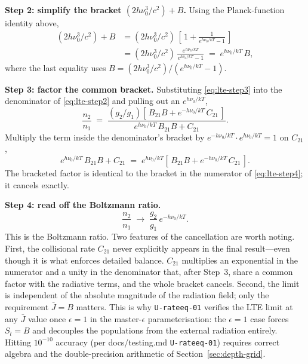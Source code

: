 \documentclass[11pt]{article}
\newcommand{\Jbar}{\bar{J}}
\begin{document}
\textbf{Step 2: simplify the bracket $(2 h\nu_0^3/c^2) + B$.}
Using the Planck-function identity above,
\begin{align}
(2 h\nu_0^3/c^2) + B
&= (2 h\nu_0^3/c^2)\,\!\left[\,1 + \frac{1}{e^{h\nu_0/kT} - 1}\,\right] \nonumber\\
&= (2 h\nu_0^3/c^2)\,\frac{e^{h\nu_0/kT}}{e^{h\nu_0/kT} - 1}
\;=\; e^{h\nu_0/kT}\, B ,
\label{eq:lte-step3}
\end{align}
where the last equality uses $B = (2 h\nu_0^3/c^2)/(e^{h\nu_0/kT} - 1)$.

\textbf{Step 3: factor the common bracket.}
Substituting \eqref{eq:lte-step3} into the denominator of
\eqref{eq:lte-step2} and pulling out an $e^{h\nu_0/kT}$,
\begin{equation}
\frac{n_2}{n_1}
\;=\; \frac{(g_2/g_1)\!\left[\, B_{21} B + e^{-h\nu_0/kT}\, C_{21}\,\right]}
       {e^{h\nu_0/kT}\, B_{21} B + C_{21}}.
\label{eq:lte-step4}
\end{equation}
Multiply the term inside the denominator's bracket by
$e^{-h\nu_0/kT}\!\cdot\! e^{h\nu_0/kT} = 1$ on $C_{21}$,
\begin{equation}
e^{h\nu_0/kT}\, B_{21} B + C_{21}
\;=\; e^{h\nu_0/kT}\!\left[\, B_{21} B + e^{-h\nu_0/kT}\, C_{21}\,\right] .
\end{equation}
The bracketed factor is identical to the bracket in the numerator of
\eqref{eq:lte-step4}; it cancels exactly.

\textbf{Step 4: read off the Boltzmann ratio.}
\begin{equation}
\boxed{\;\frac{n_2}{n_1} \;\to\; \frac{g_2}{g_1}\, e^{-h\nu_0/kT}.\;}
\label{eq:boltzmann}
\end{equation}
This is the Boltzmann ratio.  Two features of the cancellation are
worth noting.  First, the collisional rate $C_{21}$ never explicitly
appears in the final result---even though it is what enforces detailed
balance.  $C_{21}$ multiplies an exponential in the numerator and a
unity in the denominator that, after Step~3, share a common factor with
the radiative terms, and the whole bracket cancels.  Second, the limit
is independent of the absolute magnitude of the radiation field; only
the requirement $\Jbar = B$ matters.  This is why
\texttt{U-rateeq-01} verifies the LTE limit at any $\Jbar$ value once
$\epsilon = 1$ in the master-$\epsilon$ parameterisation: the
$\epsilon = 1$ case forces $S_l = B$ and decouples the populations from
the external radiation entirely.  Hitting $10^{-10}$ accuracy (per
docs/testing.md \texttt{U-rateeq-01}) requires correct algebra and the
double-precision arithmetic of Section~\ref{sec:depth-grid}.
\end{document}
